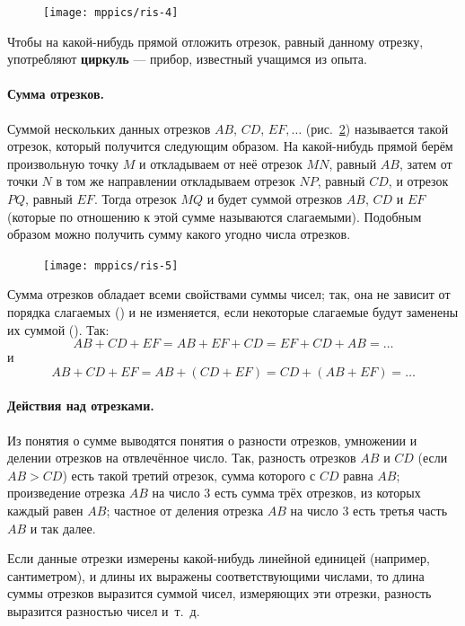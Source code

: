 \documentclass[twoside]{book}
\begin{document}
\begin{figure}[h!]
\centering
\texttt{[image: mppics/ris-4]}
\caption{}\label{1938/ris-4}
\end{figure}


Чтобы на какой-нибудь прямой отложить отрезок, равный данному отрезку, употребляют \textbf{циркуль} — прибор, известный учащимся из опыта.

\paragraph{Сумма отрезков.}\label{1938/7}
Суммой нескольких данных отрезков $AB$, $CD$, $EF,\dots$
(рис.~\ref{1938/ris-5}) называется такой отрезок, который получится следующим образом.
На какой-нибудь прямой берём произвольную точку $M$ и откладываем от неё отрезок $MN$, равный $AB$, затем от точки $N$ в том же направлении откладываем отрезок $NP$, равный $CD$, и отрезок $PQ$, равный $EF$.
Тогда отрезок $MQ$ и будет суммой отрезков $AB$, $CD$ и $EF$ (которые по отношению к этой сумме называются слагаемыми).
Подобным образом можно получить сумму какого угодно числа отрезков.

\begin{figure}[h!]
\centering
\texttt{[image: mppics/ris-5]}
\caption{}\label{1938/ris-5}
\end{figure}

Сумма отрезков обладает всеми свойствами суммы чисел;
так, она не зависит от порядка слагаемых () и не изменяется, если некоторые слагаемые будут заменены их суммой ().
Так:
\[AB+CD+EF=AB+EF+CD=EF+CD+AB=\dots\]
и
\[AB+CD+EF=AB+(CD+EF)=CD+(AB+EF)=\dots\]

\paragraph{Действия над отрезками.}\label{1938/8}
Из понятия о сумме выводятся понятия о разности отрезков, умножении и делении отрезков на отвлечённое число.
Так, разность отрезков $AB$ и $CD$ (если $AB>CD$) есть такой третий отрезок, сумма которого с $CD$ равна $AB$;
произведение отрезка $AB$ на число $3$ есть сумма трёх отрезков, из которых каждый равен $AB$;
частное от деления отрезка $AB$ на число $3$ есть третья часть $AB$ и так далее.

Если данные отрезки измерены какой-нибудь линейной единицей (например, сантиметром), и длины их выражены соответствующими числами, то длина суммы отрезков выразится суммой чисел, измеряющих эти отрезки, разность выразится разностью чисел и~т.~д.
\end{document}
